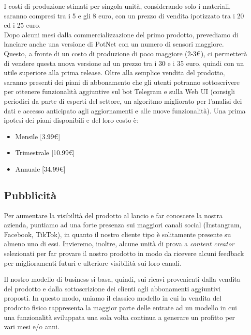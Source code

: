 I costi di produzione stimati per singola unità, considerando solo i materiali, saranno compresi tra i 5 e gli 8 euro, con un prezzo di vendita ipotizzato tra i 20 ed i 25 euro. \\Dopo alcuni mesi dalla commercializzazione del primo prodotto, prevediamo di lanciare anche una versione di PotNet con un numero di sensori maggiore. Questo, a fronte di un costo di produzione di poco maggiore (2-3€), ci permetterà di vendere questa nuova versione ad un prezzo tra i 30 e i 35 euro, quindi con un utile superiore alla prima release.
\newline\newline Oltre alla semplice vendita del prodotto, saranno presenti dei piani di abbonamento che gli utenti potranno sottoscrivere per ottenere funzionalità aggiuntive sul bot Telegram e sulla Web UI (consigli periodici da parte di esperti del settore, un algoritmo migliorato per l'analisi dei dati e accesso anticipato agli aggiornamenti e alle nuove funzionalità).
Una prima ipotesi dei piani disponibili e del loro costo è:
\begin{itemize}
	\item Mensile [3.99€]
	\item Trimestrale [10.99€]
	\item Annuale [34.99€]
\end{itemize}

\subsection{Pubblicità}

Per aumentare la visibilità del prodotto al lancio e far conoscere la nostra azienda, puntiamo ad una forte presenza sui maggiori canali social (Instangram, Facebook, TikTok), in quanto il nostro cliente tipo è solitamente presente su almeno uno di essi. Invieremo, inoltre, alcune unità di prova a \textit{content creator} selezionati per far provare il nostro prodotto in modo da ricevere alcuni feedback per miglioramenti futuri e ulteriore visibilità sui loro canali.

Il nostro modello di business si basa, quindi, sui ricavi provenienti dalla vendita del prodotto e dalla sottoscrizione dei clienti agli abbonamenti aggiuntivi proposti. In questo modo, uniamo il classico modello in cui la vendita del prodotto fisico rappresenta la maggior parte delle entrate ad un modello in cui una funzionalità sviluppata una sola volta continua a generare un profitto per vari mesi e/o anni.

